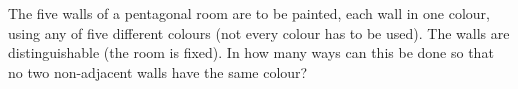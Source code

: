 The five walls of a pentagonal room are to be painted, each wall in one colour, using any of five different colours (not every colour has to be used). The walls are distinguishable (the room is fixed). In how many ways can this be done so that no two non-adjacent walls have the same colour?
